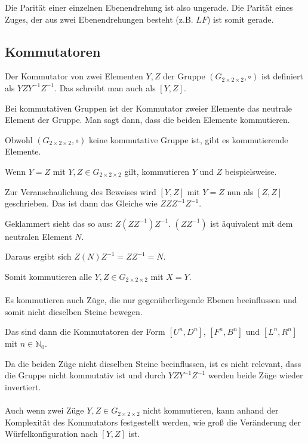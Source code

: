 \documentclass[12pt,a4paper, usenames, dvipsnames]{article}
\newcommand{\Gtwo}{\ensuremath{G_{2\times 2\times 2}}}
\begin{document}
Die Parität einer einzelnen Ebenendrehung ist also ungerade. Die Parität eines Zuges, der aus zwei Ebenendrehungen besteht (z.B. $LF$) ist somit gerade.


%
%
%
%
%
%
%
%
%
%
%
%
%
%
%
%
%
%
%
%
\subsection*{Kommutatoren}

Der Kommutator von zwei Elementen $Y, Z$ der Gruppe $(\Gtwo, \circ)$ ist definiert als $YZY^{-1}Z^{-1}$. Das schreibt man auch als $[Y,Z]$. 


Bei kommutativen Gruppen ist der Kommutator zweier Elemente das neutrale Element der Gruppe. \cite{TD} Man sagt dann, dass die beiden Elemente kommutieren. 


Obwohl $(\Gtwo, \circ)$ keine kommutative Gruppe ist, gibt es kommutierende Elemente. 


Wenn $Y = Z$ mit $Y, Z \in \Gtwo$ gilt, kommutieren $Y$ und $Z$ beispielsweise. 


Zur Veranschaulichung des Beweises wird $[Y,Z]$ mit $Y=Z$ nun als $[Z,Z]$ geschrieben. Das ist dann das Gleiche wie $ZZZ^{-1}Z^{-1}$. 


Geklammert sieht das so aus: $Z(ZZ^{-1})Z^{-1}$. $(ZZ^{-1})$ ist äquivalent mit dem neutralen Element $N$. 

Daraus ergibt sich $Z(N)Z^{-1} = ZZ^{-1} = N$. 


Somit kommutieren alle $Y, Z \in \Gtwo$ mit $X=Y$.
\\
\\
Es kommutieren auch Züge, die nur gegenüberliegende Ebenen beeinflussen und somit nicht dieselben Steine bewegen. 

Das sind dann die Kommutatoren der Form $[U^n, D^n]$, $[F^n, B^n]$ und $[L^n, R^n]$ mit $n \in \mathbb{N}_0$. 

Da die beiden Züge nicht dieselben Steine beeinflussen, ist es nicht relevant, dass die Gruppe nicht kommutativ ist und durch $YZY^{-1}Z^{-1}$ werden beide Züge wieder invertiert. \\
\\
Auch wenn zwei Züge $Y, Z \in \Gtwo$ nicht kommutieren, kann anhand der Komplexität des Kommutators festgestellt werden, wie groß die Veränderung der Würfelkonfiguration nach $[Y, Z]$ ist. 
\end{document}
